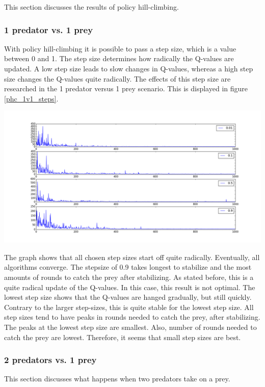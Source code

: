 This section discusses the results of policy hill-climbing.

\subsubsection{1 predator vs. 1 prey}
With policy hill-climbing it is possible to pass a step size, which is a value between 0 and 1. The step size determines how radically the Q-values are updated. A low step size leads to slow changes in Q-values, whereas a high step size changes the Q-values quite radically. The effects of this step size are researched in the 1 predator versus 1 prey scenario. This is displayed in figure \ref{phc_1v1_steps}.

\begin{center}
	\includegraphics[scale=0.3]{allplots_hillclimbing}
	\label{graph:phc_1v1_steps}
\end{center}

The graph shows that all chosen step sizes start off quite radically. Eventually, all algorithms converge. The stepsize of 0.9 takes longest to stabilize and the most amounts of rounds to catch the prey after stabilizing. As stated before, this is a quite radical update of the Q-values. In this case, this result is not optimal. The lowest step size shows that the Q-values are hanged gradually, but still quickly. Contrary to the larger step-sizes, this is quite stable for the lowest step size. All step sizes tend to have peaks in rounds needed to catch the prey, after stabilizing. The peaks at the lowest step size are smallest. Also, number of rounds needed to catch the prey are lowest. Therefore, it seems that small step sizes are best.

\subsubsection{2 predators vs. 1 prey}
This section discusses what happens when two predators take on a prey.

